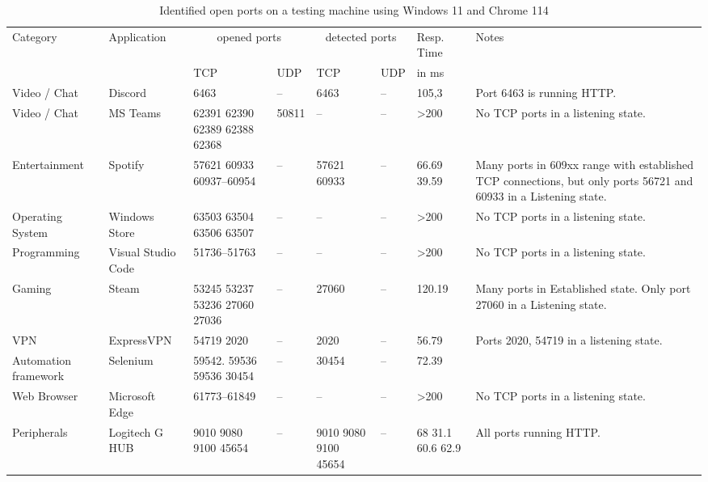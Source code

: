 \begin{table}[htbp]
\footnotesize
\centering
\begin{adjustwidth}{-0.5cm}{}
\begin{tabular}{p{2cm}p{2cm}p{1cm}p{1cm}p{1cm}p{1cm}p{1cm}p{5cm}}
    \toprule
    Category & Application & \multicolumn{2}{c}{opened ports} & \multicolumn{2}{c}{detected ports} & Resp. Time & Notes\\
     \cmidrule{3-4} \cmidrule{5-6} \cmidrule{7-7}
     & & TCP & UDP & TCP & UDP & in ms & \\
     \midrule
     Video / Chat & Discord & 6463 & -- & 6463 & -- & 105,3 & Port 6463 is running HTTP. \\
     Video / Chat & MS Teams & 62391 62390 62389 62388 62368 & 50811 & -- & -- & >200 & No TCP ports in a listening state. \\
     Entertainment & Spotify & 57621 60933 60937--60954 & -- & 57621 60933 & -- & 66.69 39.59 & Many ports in 609xx range with established TCP connections, but only ports 56721 and 60933 in a Listening state. \\ 
     Operating System & Windows Store & 63503 63504 63506 63507 & -- & -- & -- & >200 & No TCP ports in a listening state. \\ 
    Programming & Visual Studio Code & 51736--51763 & -- & -- & -- & >200 & No TCP ports in a listening state. \\ 
    Gaming & Steam & 53245 53237 53236 27060 27036 & -- & 27060 & -- & 120.19 & Many ports in Established state. Only port 27060 in a Listening state. \\ 
    VPN & ExpressVPN & 54719 2020 & -- & 2020 & -- & 56.79 & Ports 2020, 54719 in a listening state. \\ 
    Automation framework & Selenium & 59542. 59536 59536 30454 & -- & 30454 & -- & 72.39 & \\ 
    Web Browser & Microsoft Edge & 61773--61849 & -- & -- & -- & >200 & No TCP ports in a listening state. \\ 
    Peripherals & Logitech G HUB & 9010 9080 9100 45654 & -- & 9010 9080 9100 45654 & -- & 68 31.1 60.6 62.9 & All ports running HTTP. \\ 
     \bottomrule
\end{tabular}
\end{adjustwidth}{}
\caption{Identified open ports on a testing machine using Windows 11 and Chrome 114}
\label{tab:identifying-applications}
\end{table}
\clearpage

